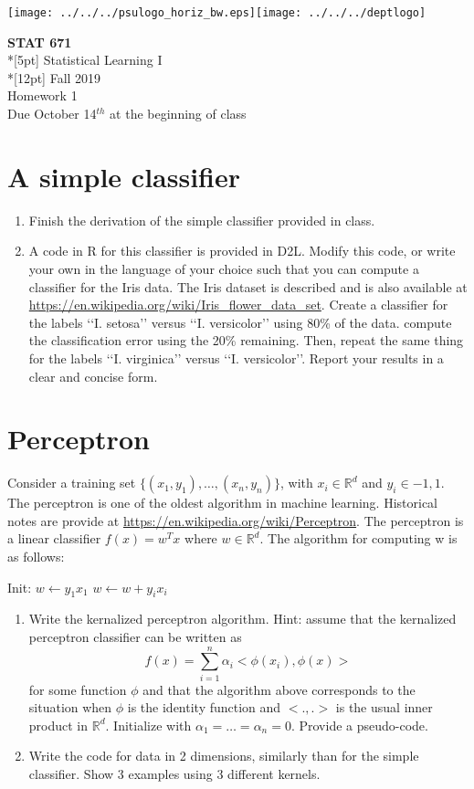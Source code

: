 \documentclass[12pt]{article}
\begin{document}
\thispagestyle{empty}
\texttt{[image: ../../../psulogo\_horiz\_bw.eps]}\hfill\texttt{[image: ../../../deptlogo]}
\vspace{10pt}
\begin{center}
{\large\bf STAT 671}    \\*[5pt] {\Large Statistical Learning I}
\\*[12pt] {\large Fall 2019}
\\ {\large Homework 1}
\\ {\large Due October 14$^{th}$ at the beginning of class}
\end{center}
\vspace{1cm}
\noindent

\section{A simple classifier}
\begin{enumerate}
\item Finish the derivation of the simple classifier provided in class. 
\item A code in R for this classifier is provided in D2L. Modify this code, or write your own in the language of your choice such that you can compute a classifier for the Iris data.  The Iris dataset is described and is also available at \url{ https://en.wikipedia.org/wiki/Iris_flower_data_set}. Create a classifier for the labels \lq\lq{}I. setosa\rq\rq{} versus \lq\lq{}I. versicolor\rq\rq{} using 80\% of the data. 
compute the classification error using the 20\% remaining. Then, repeat the same thing for the labels \lq\lq{}I. virginica\rq\rq{} versus \lq\lq{}I. versicolor\rq\rq{}. Report your results in a clear and concise form. 
\end{enumerate}
 \section{Perceptron}
Consider a training set $\{(x_1,y_1),\ldots,(x_n,y_n)\}$, with $x_i \in \mathbb{R}^d$ and $y_i \in {-1,1}$. The perceptron is one of the oldest algorithm in machine learning. Historical notes are provide at \url{https://en.wikipedia.org/wiki/Perceptron}. 
The perceptron is a linear classifier $f(x)=w^Tx$ where $w \in \mathbb{R}^d$. 
The algorithm for computing w is as follows: 
\begin{algorithmic}
\State Init: $w \leftarrow y_1x_1$
 $w \leftarrow w + y_ix_i$
\EndIf
\EndFor
\end{algorithmic}
\begin{enumerate}
\item Write the kernalized perceptron algorithm. Hint: assume that the kernalized perceptron classifier can be written as 
$$f(x) =\sum_{i=1}^n \alpha_i <\phi(x_i),\phi(x)>$$
for some function $\phi$ and that the algorithm above corresponds to the situation when  $\phi$ is the identity function and $<.,.>$ is the usual  inner product in $\mathbb{R}^d$. Initialize with $\alpha_1=\ldots=\alpha_n=0$. Provide a pseudo-code.     
\item Write the code for data in 2 dimensions, similarly than for the simple classifier. Show 3 examples using 3 different kernels. 
\end{enumerate}
\end{document}
